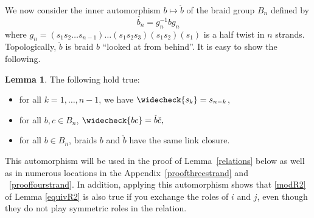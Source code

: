 \documentclass[12pt,reqno]{amsart}
\theoremstyle{definition}
\newtheorem{lemma}[theorem]{Lemma}
\def\be{\begin{equation}}
\def\ee{\end{equation}}
\begin{document}
We now consider the inner automorphism $b \mapsto \check{b}$ of the braid group
$B_n$ defined by
\be
\label{innerB}
\check{b_n} = g_n^{-1} b g_n
\ee
where $g_n = (s_1 s_2 \ldots s_{n-1}) \ldots (s_1 s_2 s_3) (s_1 s_2) (s_1)$ is a
half twist in $n$ strands. Topologically, $\check{b}$ is braid $b$
``looked at from behind''.  It is easy to show the following. 

\begin{lemma}
\label{innerautomorphism}
The following hold true:
\begin{itemize}
\item
  for all $k=1,\dots,n-1$, we have $\widecheck{s_k} = s_{n-k}$,
\item
  for all $b, c \in B_n$, $\widecheck{b c} = \check{b} \check{c},$
\item
  for all $b \in B_n$, braids $b$ and $ \check{b}$ have the same link closure.
\end{itemize}
\end{lemma}

This automorphism will be used in the proof of Lemma~\ref{relations} below as well as in numerous locations in the Appendix~\ref{proofthreestrand} and ~\ref{prooffourstrand}. In addition, applying this automorphism shows that \eqref{modR2} of Lemma \ref{equivR2} is also true if you exchange the roles of $i$ and $j$, even though they do not play symmetric roles in the relation.
\end{document}
